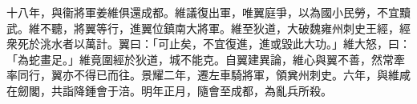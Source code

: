 \begin{pinyinscope}
 
十八年，與衞將軍姜維俱還成都。維議復出軍，唯翼庭爭，以為國小民勞，不宜黷武。維不聽，將翼等行，進翼位鎮南大將軍。維至狄道，大破魏雍州刺史王經，經衆死於洮水者以萬計。翼曰：「可止矣，不宜復進，進或毀此大功。」維大怒，曰：「為蛇畫足。」維竟圍經於狄道，城不能克。自翼建異論，維心與翼不善，然常牽率同行，翼亦不得已而往。景耀二年，遷左車騎將軍，領兾州刺史。六年，與維咸在劒閣，共詣降鍾會于涪。明年正月，隨會至成都，為亂兵所殺。
 
 
\end{pinyinscope}
